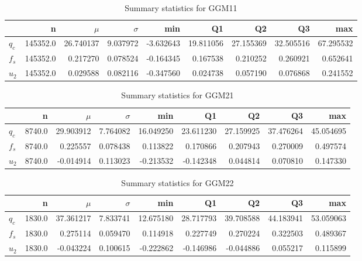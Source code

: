 \begin{table}[h]
\caption{Summary statistics for GGM11}
\begin{tabular}{lrrrrrrrr}
\toprule
{} &         n &      $\mu$ &  $\sigma$ &       min &         Q1 &         Q2 &         Q3 &        max \\
\midrule
$q_c$ &  145352.0 &  26.740137 &  9.037972 & -3.632643 &  19.811056 &  27.155369 &  32.505516 &  67.295532 \\
$f_s$ &  145352.0 &   0.217270 &  0.078524 & -0.164345 &   0.167538 &   0.210252 &   0.260921 &   0.652641 \\
$u_2$ &  145352.0 &   0.029588 &  0.082116 & -0.347560 &   0.024738 &   0.057190 &   0.076868 &   0.241552 \\
\bottomrule
\end{tabular}
\end{table}

\begin{table}[h]
\caption{Summary statistics for GGM21}
\begin{tabular}{lrrrrrrrr}
\toprule
{} &       n &      $\mu$ &  $\sigma$ &        min &         Q1 &         Q2 &         Q3 &        max \\
\midrule
$q_c$ &  8740.0 &  29.903912 &  7.764082 &  16.049250 &  23.611230 &  27.159925 &  37.476264 &  45.054695 \\
$f_s$ &  8740.0 &   0.225557 &  0.078438 &   0.113822 &   0.170866 &   0.207943 &   0.270009 &   0.497574 \\
$u_2$ &  8740.0 &  -0.014914 &  0.113023 &  -0.213532 &  -0.142348 &   0.044814 &   0.070810 &   0.147330 \\
\bottomrule
\end{tabular}
\end{table}

\begin{table}[h]
\caption{Summary statistics for GGM22}
\begin{tabular}{lrrrrrrrr}
\toprule
{} &       n &      $\mu$ &  $\sigma$ &        min &         Q1 &         Q2 &         Q3 &        max \\
\midrule
$q_c$ &  1830.0 &  37.361217 &  7.833741 &  12.675180 &  28.717793 &  39.708588 &  44.183941 &  53.059063 \\
$f_s$ &  1830.0 &   0.275114 &  0.059470 &   0.114918 &   0.227749 &   0.270224 &   0.322503 &   0.489367 \\
$u_2$ &  1830.0 &  -0.043224 &  0.100615 &  -0.222862 &  -0.146986 &  -0.044886 &   0.055217 &   0.115899 \\
\bottomrule
\end{tabular}
\end{table}

